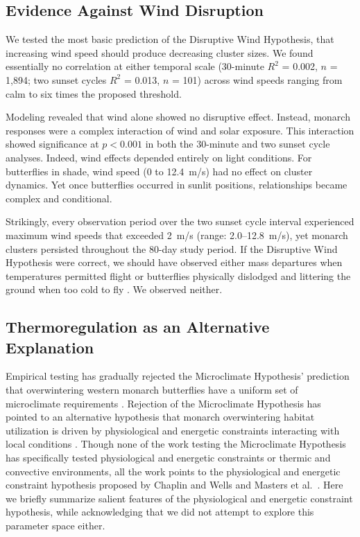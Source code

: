 \documentclass[insects,article,submit,pdftex,moreauthors]{Definitions/mdpi}
\begin{document}
\subsection{Evidence Against Wind Disruption}

We tested the most basic prediction of the Disruptive Wind Hypothesis, that increasing wind speed should produce decreasing cluster sizes. We found essentially no correlation at either temporal scale (30-minute $R^{2}$ = 0.002, $n$ = 1,894; two sunset cycles $R^{2}$ = 0.013, $n$ = 101) across wind speeds ranging from calm to six times the proposed threshold.

Modeling revealed that wind alone showed no disruptive effect. Instead, monarch responses were a complex interaction of wind and solar exposure. This interaction showed significance at $p < 0.001$ in both the 30-minute and two sunset cycle analyses. Indeed, wind effects depended entirely on light conditions. For butterflies in shade, wind speed (0 to 12.4~m/s) had no effect on cluster dynamics. Yet once butterflies occurred in sunlit positions, relationships became complex and conditional.

Strikingly, every observation period over the two sunset cycle interval experienced maximum wind speeds that exceeded 2~m/s (range: 2.0--12.8~m/s), yet monarch clusters persisted throughout the 80-day study period. If the Disruptive Wind Hypothesis were correct, we should have observed either mass departures when temperatures permitted flight or butterflies physically dislodged and littering the ground when too cold to fly \cite{leongRestorationOverwinteringGrove1999}. We observed neither.

\subsection{Thermoregulation as an Alternative Explanation}

Empirical testing has gradually rejected the Microclimate Hypothesis' prediction that overwintering western monarch butterflies have a uniform set of microclimate requirements \cite{fisherMultiScaleSpeciesDistribution2024,sanieeHierarchyScaleInfluence2022,ibsenDensityDependenceHabitat2026}. Rejection of the Microclimate Hypothesis has pointed to an alternative hypothesis that monarch overwintering habitat utilization is driven by physiological and energetic constraints interacting with local conditions \cite{fisherMultiScaleSpeciesDistribution2024,sanieeHierarchyScaleInfluence2022}. Though none of the work testing the Microclimate Hypothesis has specifically tested physiological and energetic constraints or thermic and convective environments, all the work points to the physiological and energetic constraint hypothesis proposed by Chaplin and Wells \cite{chaplinEnergyReservesMetabolic1982} and Masters et al.\ \cite{mastersMonarchButterflyDanaus1988}. Here we briefly summarize salient features of the physiological and energetic constraint hypothesis, while acknowledging that we did not attempt to explore this parameter space either.
\end{document}
